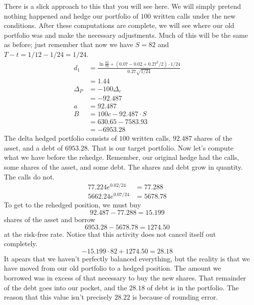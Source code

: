\documentclass{ximera}
\begin{document}
\begin{solution}
There is a slick approach to this that you will see here. We will simply pretend nothing happened and hedge our portfolio of $100$ written calls under the new conditions. After these computations are complete, we will see where our old portfolio was and make the necessary adjustments. Much of this will be the same as before; just remember that now we have $S=82$ and $T-t=1/12-1/24=1/24$.
	\begin{align*}
	d_1 				&=\frac{\ln\frac{82}{76}+(0.07-0.02+0.27^2/2)\cdot 1/24}{0.27\sqrt{1/24}}\\
					&=1.44\\
	\Delta_P 			&=-100\Delta_c\\
					&=-92.487\\
	a 				&=92.487\\
	B 				&=100c-92.487\cdot S\\
					&=630.65-7583.93\\
					&=-6953.28
	\end{align*}
The delta hedged portfolio consists of $100$ written calls, $92.487$ shares of the asset, and a debt of $6953.28$. That is our target portfolio. Now let's compute what we have before the rehedge. Remember, our original hedge had the calls, some shares of the asset, and some debt. The shares and debt grow in quantity. The calls do not.
	\begin{align*}
	77.224e^{0.02/24} 	&=77.288\\
	5662.24e^{0.07/24} 	&=5678.78
	\end{align*}
To get to the rehedged position, we must buy
	\begin{equation*}
	92.487-77.288=15.199
	\end{equation*}
shares of the asset and borrow
	\begin{equation*}
	6953.28-5678.78=1274.50
	\end{equation*}
at the risk-free rate. Notice that this activity does not cancel itself out completely.
	\begin{equation*}
	-15.199\cdot 82+1274.50=28.18
	\end{equation*}
It apears that we haven't perfectly balanced everything, but the reality is that we have moved from our old portfolio to a hedged position. The amount we borrowed was in excess of that necessary to buy the new shares. That remainder of the debt goes into our pocket, and the $28.18$ of debt is in the portfolio. The reason that this value isn't precisely $28.22$ is because of rounding error.
\end{solution}
\end{document}
